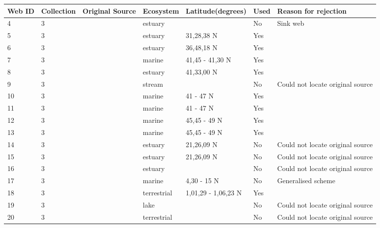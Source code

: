 \documentclass[12pt]{article}
\begin{document}
\begin{landscape}
    \begin{table}[h!]
    \centering
    {\footnotesize
      \begin{tabular}{p{2.8cm}p{1.3cm}p{5.5cm}p{2.2cm}p{2.5cm}lp{3.5cm}}
        \hline
        Web ID & Collection & Original Source & Ecosystem & Latitude(degrees) & Used  & Reason for rejection  \\
        \hline
        4     & 3 & \cite{Johnston1956}    & estuary &       & No    & Sink web \\
        5     & 3 & \cite{Teal1962}    & estuary & 31,28,38 N & Yes   &       \\
        6     & 3 & \cite{MacGinitie1935}    & estuary & 36,48,18 N & Yes   &       \\
        7     & 3 & \cite{Kremer1978}    & marine & 41,45 - 41,30 N & Yes   &       \\
        8     & 3 & \cite{Nixon1973}    & estuary & 41,33,00 N & Yes   &       \\
        9     & 3 & \cite{Kitching1967}  & stream &       & No    & Could not locate original source \\
        10    & 3 & \cite{Menge1976}    & marine & 41 - 47 N & Yes   &       \\
        11    & 3 & \cite{Menge1976}    & marine & 41 - 47 N & Yes   &       \\
        12    & 3 & \cite{Menge1976}    & marine & 45,45 - 49 N & Yes   &       \\
        13    & 3 & \cite{Menge1976}    & marine & 45,45 - 49 N & Yes   &       \\
        14    & 3 & \cite{Walsh1967}  & estuary & 21,26,09 N & No    & Could not locate original source \\
        15    & 3 & \cite{Walsh1967}  & estuary & 21,26,09 N & No    & Could not locate original source \\
        16    & 3 & \cite{Copeland1974}    & estuary &       & No    & Could not locate original source \\
        17    & 3 & \cite{Hiatt1960}  & marine & 4,30 - 15 N & No    & Generalised scheme \\
        18    & 3 & \cite{Niering1963a}  & terrestrial & 1,01,29 - 1,06,23 N & Yes   &       \\
        19    & 3 & \cite{Brooks1963}    & lake &       & No    & Could not locate original source \\
        20    & 3 & \cite{Knox1970}  & terrestrial &       & No    & Could not locate original source \\

\end{tabular}}
\end{table}
\end{landscape}
\end{document}
